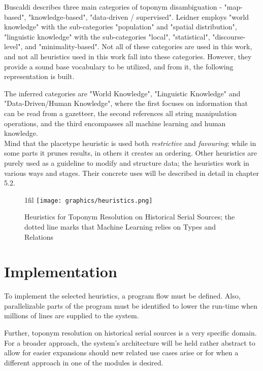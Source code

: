 \documentclass[11pt]{article}
\makeatletter
\newcommand*{\centerfloat}{
  \parindent \z@
  \leftskip \z@ \@plus 1fil \@minus \textwidth
  \rightskip\leftskip
  \parfillskip \z@skip}
\makeatother
\begin{document}
Buscaldi describes three main categories of toponym disambiguation - "map-based", "knowledge-based", "data-driven / supervised". \cite{buscaldi11} Leidner employs "world knowledge" with the sub-categories "population" and "spatial distribution", "linguistic knowledge" with the sub-categories "local", "statistical", "discourse-level", and "minimality-based". \cite[p. 111]{leidner07} Not all of these categories are used in this work, and not all heuristics used in this work fall into these categories. However, they provide a sound base vocabulary to be utilized, and from it, the following representation is built.

The inferred categories are "World Knowledge", "Linguistic Knowledge" and "Data-Driven/Human Knowledge", where the first focuses on information that can be read from a gazetteer, the second references all string manipulation operations, and the third encompasses all machine learning and human knowledge.\\

Mind that the placetype heuristic is used both \emph{restrictive} and \emph{favouring}; while in some parts it prunes results, in others it creates an ordering. Other heuristics are purely used as a guideline to modify and structure data; the heuristics work in various ways and stages. Their concrete uses will be described in detail in chapter 5.2.

\begin{figure}
  \centerfloat
    \texttt{[image: graphics/heuristics.png]}
  \caption{Heuristics for Toponym Resolution on Historical Serial Sources; the dotted line marks that Machine Learning relies on Types and Relations}
  \label{fig:heuristics}
\end{figure}

\newpage
\section{Implementation}

To implement the selected heuristics, a program flow must be defined. Also, parallelizable parts of the program must be identified to lower the run-time when millions of lines are supplied to the system.

Further, toponym resolution on historical serial sources is a very specific domain. For a broader approach, the system's architecture will be held rather abstract to allow for easier expansions should new related use cases arise or for when a different approach in one of the modules is desired.
\end{document}
